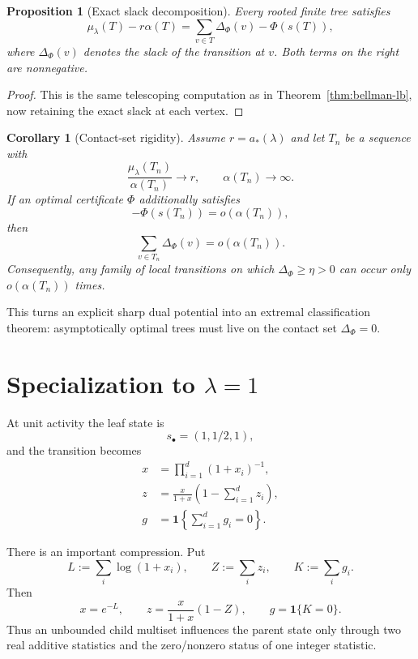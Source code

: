 \documentclass[11pt,a4paper]{article}
\newtheorem{corollary}[theorem]{Corollary}
\newtheorem{proposition}[theorem]{Proposition}
\theoremstyle{definition}
\theoremstyle{remark}
\newcommand{\1}{\mathbf 1}
\begin{document}
\begin{proposition}[Exact slack decomposition]
\label{prop:slack}
Every rooted finite tree satisfies
\begin{equation}
  \mu_\lambda(T)-r\alpha(T)
  =\sum_{v\in T}\Delta_\Phi(v)-\Phi(s(T)),
  \label{eq:slack-decomp}
\end{equation}
where $\Delta_\Phi(v)$ denotes the slack of the transition at $v$.
Both terms on the right are nonnegative.
\end{proposition}

\begin{proof}
This is the same telescoping computation as in
Theorem~\ref{thm:bellman-lb}, now retaining the exact slack at each vertex.
\end{proof}

\begin{corollary}[Contact-set rigidity]
\label{cor:rigidity}
Assume $r=a_*(\lambda)$ and let $T_n$ be a sequence with
\[
  \frac{\mu_\lambda(T_n)}{\alpha(T_n)}\longrightarrow r,
  \qquad
  \alpha(T_n)\longrightarrow\infty.
\]
If an optimal certificate $\Phi$ additionally satisfies
\[
  -\Phi(s(T_n))=o(\alpha(T_n)),
\]
then
\[
  \sum_{v\in T_n}\Delta_\Phi(v)=o(\alpha(T_n)).
\]
Consequently, any family of local transitions on which
$\Delta_\Phi\ge\eta>0$ can occur only $o(\alpha(T_n))$ times.
\end{corollary}

This turns an explicit sharp dual potential into an extremal classification theorem: asymptotically
optimal trees must live on the contact set $\Delta_\Phi=0$.

\section{Specialization to $\lambda=1$}

At unit activity the leaf state is
\begin{equation}
  s_\bullet=(1,1/2,1),
\end{equation}
and the transition becomes
\begin{align}
  x&=\prod_{i=1}^d(1+x_i)^{-1},
  \label{eq:unit-x}\\
  z&=\frac{x}{1+x}\left(1-\sum_{i=1}^d z_i\right),
  \label{eq:unit-z}\\
  g&=\1\!\left\{\sum_{i=1}^d g_i=0\right\}.
  \label{eq:unit-g}
\end{align}

There is an important compression.  Put
\begin{equation}
  L:=\sum_i\log(1+x_i),
  \qquad
  Z:=\sum_i z_i,
  \qquad
  K:=\sum_i g_i.
  \label{eq:aggregates}
\end{equation}
Then
\begin{equation}
  \boxed{
  x=e^{-L},
  \qquad
  z=\frac{x}{1+x}(1-Z),
  \qquad
  g=\1\{K=0\}.}
  \label{eq:aggregate-transition}
\end{equation}
Thus an unbounded child multiset influences the parent state only through two real additive
statistics and the zero/nonzero status of one integer statistic.
\end{document}
